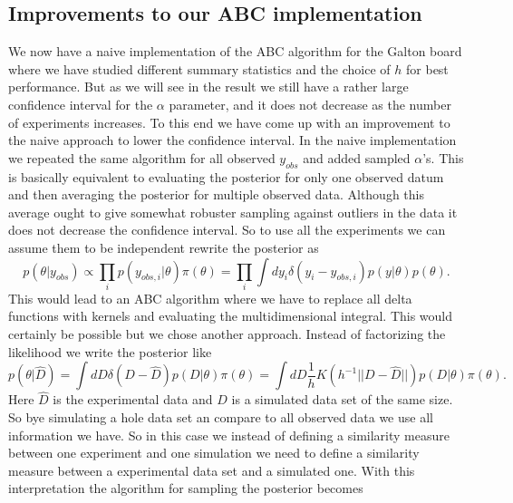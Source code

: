 \documentclass[11pt,a4paper]{article}
\begin{document}




\subsection{Improvements to our ABC implementation}

We now have a naive implementation of the ABC algorithm for the Galton board where we have studied different summary statistics and the choice of $h$ for best performance. But as we will see in the result we still have a rather large confidence interval for the $\alpha$ parameter, and it does not decrease as the number of experiments increases. To this end we have come up with an improvement to the naive approach to lower the confidence interval. In the naive implementation we repeated the same algorithm for all observed $y_{obs}$ and added sampled $\alpha$'s. This is basically equivalent to evaluating the posterior for only one observed datum and then averaging the posterior for multiple observed data. Although this average ought to give somewhat robuster sampling against outliers in the data it does not decrease the confidence interval. So to use all the experiments we can assume them to be independent rewrite the posterior as
\begin{equation*}
    p(\theta|y_{obs}) \propto  \prod_i p(y_{obs,i}|\theta)\pi(\theta) = \prod_{i} \int d y_i \delta(y_i-y_{obs, i})p(y|\theta) p(\theta).
\end{equation*}
This would lead to an ABC algorithm where we have to replace all delta functions with kernels and evaluating the multidimensional integral. This would certainly be possible but we chose another approach. Instead of factorizing the likelihood we write the posterior like 
\begin{equation*}
    p(\theta|\hat{D}) = \int dD \delta(D - \hat{D}) p(D|\theta) \pi(\theta) = \int dD \frac{1}{h} K(h^{-1}||D - \hat{D}||) p(D|\theta) \pi(\theta).
\end{equation*}
Here $\hat{D}$ is the experimental data and $D$ is a simulated data set of the same size. So bye simulating a hole data set an compare to all observed data we use all information we have. So in this case we instead of defining a similarity measure between one experiment and one simulation we need to define a similarity measure between a experimental data set and a simulated one. With this interpretation the algorithm for sampling the posterior becomes
\end{document}

